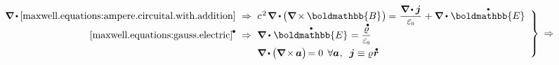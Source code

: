 \nopagebreak\vspace{.2em}\begin{equation*}
\left.\begin{array}{r@{\hspace{.6em}}c@{\hspace{.6em}}l}
\boldnabla \hspace{-0.1ex} \dotp \hspace{-0.1ex} \eqref{maxwell.equations:ampere.circuital.with.addition}
& \Rightarrow &
c^{\hspace{.16ex}2} \hspace{.22ex} \boldnabla \dotp \hspace{-0.1ex} \bigl( \boldnabla \hspace{-0.15ex} \times \hspace{-0.1ex} \boldmathbb{B} \hspace{.1ex} \bigr) \hspace{-0.1ex}
= \hspace{.1ex} \smash{\displaystyle \frac{\boldnabla \hspace{-0.15ex} \dotp \currentdensity}{\raisemath{.16em}{\vacuumpermittivity}}} \hspace{.1ex} + \boldnabla \dotp \hspace{.1ex} \mathdotabove{\boldmathbb{E}}
\\[.5em]
%
\eqref{maxwell.equations:gauss.electric}^{\hspace{-0.05ex}\tikz[baseline=-0.4ex]\draw[black, fill=black] (0,0) circle (.28ex);}
& \Rightarrow &
\boldnabla \dotp \hspace{.1ex} \mathdotabove{\boldmathbb{E}} \hspace{.1ex} = \smash{\displaystyle \frac{\mathdotabove{\chargedensity}}{\raisemath{.16em}{\vacuumpermittivity}}}
\\[.64em]
%
& &
\boldnabla \hspace{-0.1ex} \dotp \hspace{-0.1ex} \bigl( \boldnabla \hspace{-0.2ex} \times \hspace{-0.16ex} \bm{a} \bigr) \hspace{-0.3ex} = 0 \:\:\forall \bm{a}
\hspace{.1ex} , \hspace{.55em}
\currentdensity \equiv \chargedensity \hspace{.1ex} \mathdotabove{\locationvector}
\end{array}\hspace{.1ex}\right\rbrace
\hspace{.5ex}\Rightarrow\hspace*{4em}
\end{equation*}

